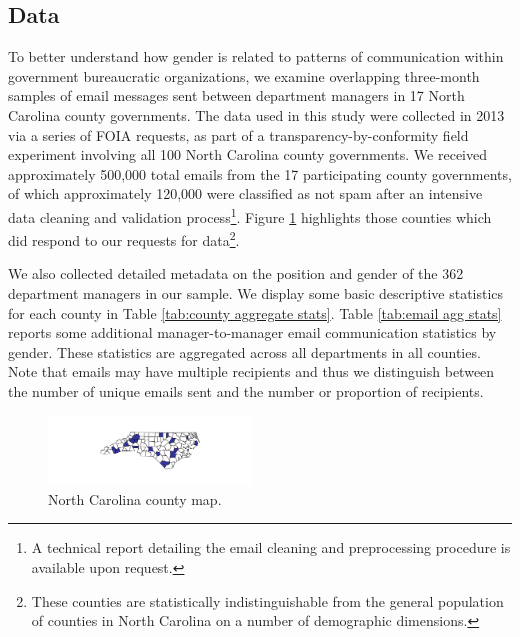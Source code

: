 \documentclass{pnastwo}
\begin{document}
\begin{article}
\section{Data}
To better understand how gender is related to patterns of communication within government bureaucratic organizations, we examine overlapping three-month samples of email messages sent between department managers in 17 North Carolina county governments. The data used in this study were collected in 2013 via a series of FOIA requests, as part of a transparency-by-conformity field experiment involving all 100 North Carolina county governments. We received approximately 500,000 total emails from the 17 participating county governments, of which approximately 120,000 were classified as not spam after an intensive data cleaning and validation process\footnote{A technical report detailing the email cleaning  and preprocessing procedure is available upon request.}. Figure \ref{fig:nc map} highlights those counties which did respond to our requests for data\footnote{These counties are statistically indistinguishable from the general population of counties in North Carolina on a number of demographic dimensions.}.

We also collected detailed metadata on the position and gender of the 362 department managers in our sample. We display some basic descriptive statistics for each county in Table \ref{tab:county aggregate stats}. Table \ref{tab:email agg stats} reports some additional manager-to-manager email communication statistics by gender. These statistics are aggregated across all departments in all counties. Note that emails may have multiple recipients and thus we distinguish between the number of unique emails sent and the number or proportion of recipients. 

\begin{figure}
\caption{\label{fig:nc map} North Carolina county map.}	
\centering
\includegraphics[width = 0.48\textwidth]{images/County_Map.pdf}
\end{figure}



\begin{table}
	

\end{table}
\end{article}
\end{document}
